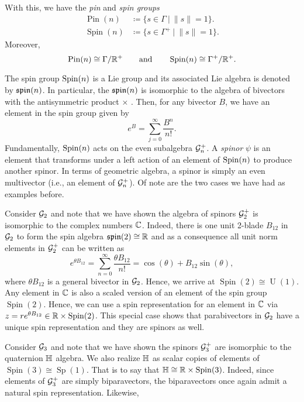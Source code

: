 With this, we have the \emph{pin} and \emph{spin groups}
\begin{align*}
    \operatorname{Pin}(n) &\coloneqq \{s\in \Gamma ~\vert~ \|s\|=1\}.\\
    \operatorname{Spin}(n) &\coloneqq \{s\in \Gamma^+ ~\vert~ \|s\|=1\}.
\end{align*}
Moreover,
\[
\operatorname{Pin}(n) \cong \Gamma/\mathbb{R}^+ \qquad \textrm{and} \qquad \operatorname{Spin}(n) \cong \Gamma^+/\mathbb{R}^+.
\]

The spin group $\operatorname{Spin}(n)$ is a Lie group and its associated Lie algebra is denoted by $\mathfrak{spin}(n)$. In particular, the $\mathfrak{spin}(n)$ is isomorphic to the algebra of bivectors with the antisymmetric product $\times$ .  Then, for any bivector $B$, we have an element in the spin group given by
\[
e^{B} = \sum_{j=0}^\infty \frac{B^n}{n!}.
\]
Fundamentally, $\operatorname{Spin}(n)$ acts on the even subalgebra $\mathcal{G}_n^+$. A \emph{spinor} $\psi$ is an element that transforms under a left action of an element of $\operatorname{Spin}(n)$ to produce another spinor.  In terms of geometric algebra, a spinor is simply an even multivector (i.e., an element of $\mathcal{G}_n^+$).  Of note are the two cases we have had as examples before. 

\begin{example}
\label{ex:exponential_of_bivector}
    Consider $\mathcal{G}_2$ and note that we have shown the algebra of spinors $\mathcal{G}_2^+$ is isomorphic to the complex numbers $\mathbb{C}$.  Indeed, there is one unit 2-blade $B_{12}$ in $\mathcal{G}_2$ to form the spin algebra $\mathfrak{spin}(2) \cong \mathbb{R}$ and as a consequence all unit norm elements in $\mathcal{G}_2^+$ can be written as
    \[
       e^{\theta B_{12}} = \sum_{n=0}^\infty \frac{\theta B_{12}}{n!} = \cos(\theta)+B_{12}\sin(\theta),
    \]
    where $\theta B_{12}$ is a general bivector in $\mathcal{G}_2$.  Hence, we arrive at $\operatorname{Spin}(2)\cong \operatorname{U}(1)$. Any element in $\mathbb{C}$ is also a scaled version of an element of the spin group $\operatorname{Spin}(2)$. Hence, we can use a spin representation for an element in $\mathbb{C}$ via $z=re^{\theta B_{12}} \in \mathbb{R}\times \operatorname{Spin}(2)$.  This special case shows that parabivectors in $\mathcal{G}_2$ have a unique spin representation and they are spinors as well.
\end{example}

\begin{example}
    Consider $\mathcal{G}_3$ and note that we have shown the spinors $\mathcal{G}_3^+$ are isomorphic to the quaternion $\mathbb{H}$ algebra.  We also realize $\mathbb{H}$ as scalar copies of elements of $\operatorname{Spin}(3) \cong \operatorname{Sp}(1)$.  That is to say that $\mathbb{H} \cong \mathbb{R} \times \operatorname{Spin}(3)$. Indeed, since elements of $\mathcal{G}_3^+$ are simply biparavectors, the biparavectors once again admit a natural spin representation. Likewise, 
\end{example}

